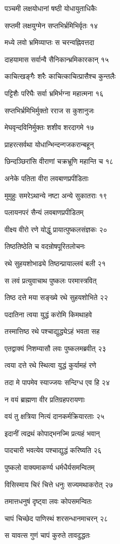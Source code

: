 पञ्चमी लक्षयोधानां षष्ठी योधायुताधिकैः

सप्तमी लक्षयुग्मेन सप्तभिर्भ्रमिभिर्वृतः १४

मध्ये लवो भ्रमिव्याप्तः स चरन्वह्निवत्तदा

दाहयामास सर्वान्वै सैनिकान्भ्रमिकारकान् १५

काचित्खङ्गैः शरैः काचित्काचित्प्रासैश्च कुन्तलैः

पट्टिशैः परिघैः सर्वा भ्रमिर्भग्ना महात्मना १६

सप्तभिर्भ्रमिभिर्मुक्तो रराज स कुशानुजः

मेघवृन्दविनिर्मुक्तः शशीव शरदागमे १७

प्राहरत्सर्वथा योधान्भिन्दन्गजकरान्बहून्

छिन्दञ्छिरांसि वीराणां चक्रभ्रूणि महान्ति च १८

अनेके पतिता वीरा लवबाणप्रपीडिताः

मुमुहुः समरेऽथान्ये नष्टा अन्ये सुकातराः १९

पलायनपरं सैन्यं लवबाणप्रपीडितम्

वीक्ष्य वीरो रणे योद्धुं प्रायात्पुष्कलसंज्ञकः २०

तिष्ठतिष्ठेति च वदन्रोषपूरितलोचनः

रथे सुहयशोभाढ्ये तिष्ठन्प्रायाल्लवं बली २१

स लवं प्रत्युवाचाथ पुष्कलः परमास्त्रवित्

तिष्ठ दत्ते मया सङ्ख्ये रथे सुहयशोभिते २२

पदातिना त्वया युद्धं करोमि किमथाहवे

तस्मात्तिष्ठ रथे पश्चाद्युद्ध्येऽहं भवता सह

एतद्वाक्यं निशम्यासौ लवः पुष्कलमब्रवीत् २३

त्वया दत्ते रथे स्थित्वा युद्धं कुर्यामहं रणे

तदा मे पापमेव स्याज्जयः सन्दिग्ध एव हि २४

न वयं ब्राह्मणा वीर प्रतिग्रहपरायणाः

वयं तु क्षत्रिया नित्यं दानकर्मक्रियारताः २५

इदानीं त्वद्रथं कोपाद्भनज्मि प्रत्यहं भवान्

पादचारी भवत्येव पश्चाद्युद्धं करिष्यति २६

पुष्कलो वाक्यमाकर्ण्य धर्मधैर्यसमन्वितम्

विसिस्माय चिरं चित्ते धनुः सज्यमथाकरोत् २७

तमात्तधनुषं दृष्ट्वा लवः कोपसमन्वितः

चापं चिच्छेद पाणिस्थं शरसन्धानमाचरन् २८

स यावत्स गुणं चापं कुरुते तावदुद्धतः


